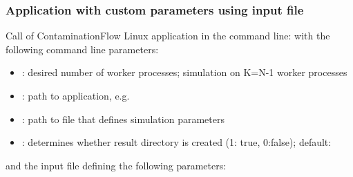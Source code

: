 \subsubsection{Application with custom parameters using input file}
Call of ContaminationFlow Linux application in the command line:
\smallskip
with the following command line parameters:
\begin{itemize}[noitemsep,topsep=0pt, partopsep=0pt]
\item {}: desired number of worker processes; simulation on K=N-1 worker processes
\item {}: path to application, e.g.\ 
\item {}: path to file that defines simulation parameters
\item {}: determines whether result directory is created (1: true, 0:false); default:
\end{itemize}
\smallskip
\smallskip
and the input file defining the following parameters:
